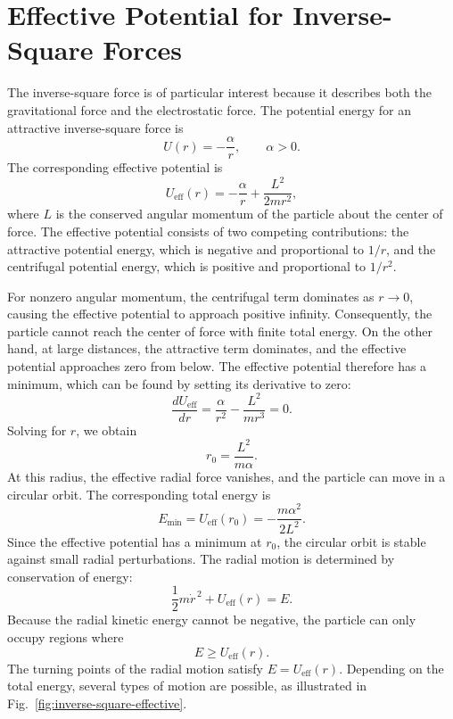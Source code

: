 \documentclass[12pt]{article}
\begin{document}
\section{Effective Potential for Inverse-Square Forces}

The inverse-square force is of particular interest because it describes both the gravitational force and the electrostatic force. The potential energy for an attractive inverse-square force is
\[
    U(r)=-\frac{\alpha}{r},
    \qquad \alpha>0.
\]
The corresponding effective potential is
\begin{equation}
    U_{\mathrm{eff}}(r)
    =-\frac{\alpha}{r}+\frac{L^2}{2mr^2},
    \label{eq:inverse-square-effective-potential}
\end{equation}
where $L$ is the conserved angular momentum of the particle about the center of force. The effective potential consists of two competing contributions: the attractive potential energy, which is negative and proportional to $1/r$, and the centrifugal potential energy, which is positive and proportional to $1/r^2$.

For nonzero angular momentum, the centrifugal term dominates as $r\to 0$, causing the effective potential to approach positive infinity. Consequently, the particle cannot reach the center of force with finite total energy. On the other hand, at large distances, the attractive term dominates, and the effective potential approaches zero from below. The effective potential therefore has a minimum, which can be found by setting its derivative to zero:
\[
    \frac{dU_{\mathrm{eff}}}{dr}
    =\frac{\alpha}{r^2}
    -\frac{L^2}{mr^3}=0.
\]
Solving for $r$, we obtain
\begin{equation}
    r_0=\frac{L^2}{m\alpha}.
    \label{eq:inverse-square-circular-radius}
\end{equation}
At this radius, the effective radial force vanishes, and the
particle can move in a circular orbit. The corresponding
total energy is
\begin{equation}
    E_{\min}
    =U_{\mathrm{eff}}(r_0)
    =-\frac{m\alpha^2}{2L^2}.
    \label{eq:inverse-square-minimum-energy}
\end{equation}
Since the effective potential has a minimum at $r_0$,
the circular orbit is stable against small radial perturbations. The radial motion is determined by conservation of energy:
\begin{equation}
    \frac{1}{2}m\dot{r}^{\,2}
    +U_{\mathrm{eff}}(r)=E.
    \label{eq:inverse-square-radial-energy}
\end{equation}
Because the radial kinetic energy cannot be negative, the
particle can only occupy regions where
\[
    E\geq U_{\mathrm{eff}}(r).
\]
The turning points of the radial motion satisfy
$E=U_{\mathrm{eff}}(r)$. Depending on the total energy, several types of motion are possible, as illustrated in Fig.~\ref{fig:inverse-square-effective}.
\end{document}
